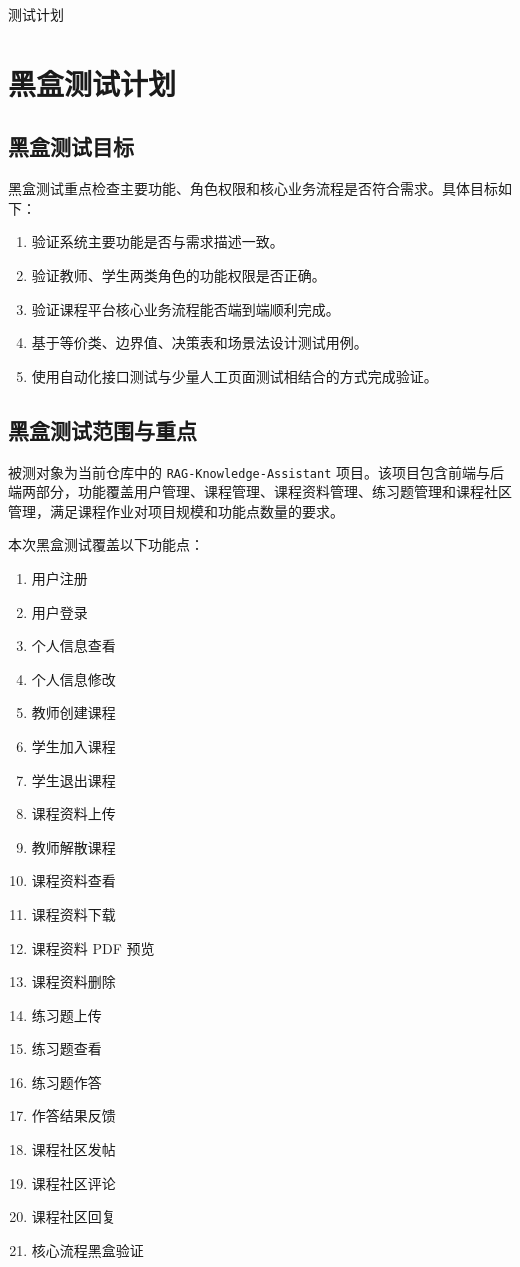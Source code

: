 \documentclass[12pt,a4paper]{ctexart}
\begin{document}
\begin{center}
{\LARGE\heiti 测试计划}
\end{center}

\section{黑盒测试计划}

\subsection{黑盒测试目标}

黑盒测试重点检查主要功能、角色权限和核心业务流程是否符合需求。具体目标如下：

\begin{enumerate}
  \item 验证系统主要功能是否与需求描述一致。
  \item 验证教师、学生两类角色的功能权限是否正确。
  \item 验证课程平台核心业务流程能否端到端顺利完成。
  \item 基于等价类、边界值、决策表和场景法设计测试用例。
  \item 使用自动化接口测试与少量人工页面测试相结合的方式完成验证。
\end{enumerate}

\subsection{黑盒测试范围与重点}

被测对象为当前仓库中的 \texttt{RAG-Knowledge-Assistant} 项目。该项目包含前端与后端两部分，功能覆盖用户管理、课程管理、课程资料管理、练习题管理和课程社区管理，满足课程作业对项目规模和功能点数量的要求。

本次黑盒测试覆盖以下功能点：

\begin{enumerate}
  \item 用户注册
  \item 用户登录
  \item 个人信息查看
  \item 个人信息修改
  \item 教师创建课程
  \item 学生加入课程
  \item 学生退出课程
  \item 课程资料上传
  \item 教师解散课程
  \item 课程资料查看
  \item 课程资料下载
  \item 课程资料 PDF 预览
  \item 课程资料删除
  \item 练习题上传
  \item 练习题查看
  \item 练习题作答
  \item 作答结果反馈
  \item 课程社区发帖
  \item 课程社区评论
  \item 课程社区回复
  \item 核心流程黑盒验证
\end{enumerate}
\end{document}
